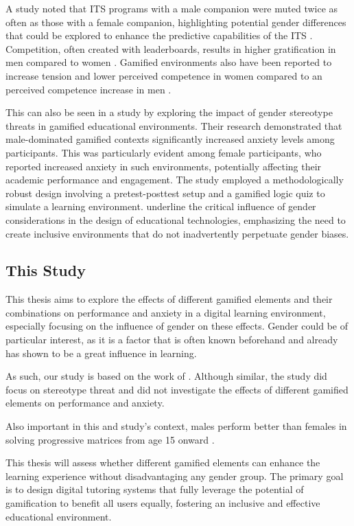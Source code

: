 A study noted that ITS programs with a male companion were muted twice as often as those with a female companion, highlighting potential gender differences that could be explored to enhance the predictive capabilities of the ITS \parencite{woolfAffectiveTutorsAutomatic2010}.
Competition, often created with leaderboards, results in higher gratification in men compared to women \parencite{lucasSexDifferencesVideo2004}.
Gamified environments also have been reported to increase tension and lower perceived competence in women compared to an perceived competence increase in men \parencite{laiszpedroDoesGamificationWork2015}.

This can also be seen in a study by \textcite{albuquerqueDoesGenderStereotype2017} exploring the impact of gender stereotype threats in gamified educational environments.
Their research demonstrated that male-dominated gamified contexts significantly increased anxiety levels among participants.
This was particularly evident among female participants, who reported increased anxiety in such environments, potentially affecting their academic performance and engagement.
The study employed a methodologically robust design involving a pretest-posttest setup and a gamified logic quiz to simulate a learning environment.
\textcite{albuquerqueDoesGenderStereotype2017} underline the critical influence of gender considerations in the design of educational technologies, emphasizing the need to create inclusive environments that do not inadvertently perpetuate gender biases. 

\subsection{This Study}
This thesis aims to explore the effects of different gamified elements and their combinations on performance and anxiety in a digital learning environment, especially focusing on the influence of gender on these effects.
Gender could be of particular interest, as it is a factor that is often known beforehand and already has shown to be a great influence in learning.

As such, our study is based on the work of \textcite{albuquerqueDoesGenderStereotype2017}.
Although similar, the study did focus on stereotype threat and did not investigate the effects of different gamified elements on performance and anxiety.

Also important in this and \textcite{albuquerqueDoesGenderStereotype2017} study's context, males perform better than females in solving progressive matrices from age 15 onward \parencite{lynnSexDifferencesProgressive2004}.

This thesis will assess whether different gamified elements can enhance the learning experience without disadvantaging any gender group.
The primary goal is to design digital tutoring systems that fully leverage the potential of gamification to benefit all users equally, fostering an inclusive and effective educational environment.
